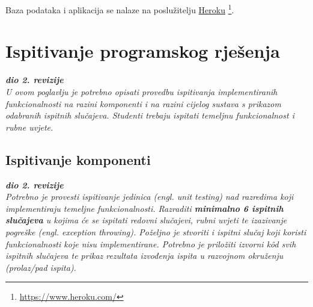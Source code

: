             Baza podataka i aplikacija se nalaze na poslužitelju \underline{Heroku}
            \footnote{\url{https://www.heroku.com/}}.
            
        
\newpage 

\begin{comment}   
        \section{Ispitivanje programskog rješenja}
			
			\textbf{\textit{dio 2. revizije}}
			
			Svi testovi izvršeni su pomoću Junit i Selenium. Ispitivanje se radilo po obrascima uporabe kako bi
            se provjerila osnovna funkcionalnost sustava, ali i nasumičnim kretanjima po aplikaciji
            kako bi se pronašle neočekivane greške  ili nepredvidena ponašanja.
            Svaki dio sustava je ispitan, no zbog jednostavnosti u dokumentaciji će biti prikazan
            samo dio ispitivanja. Prikazivanje ispitivanja UC?, UC?, UC?,UC?, UC? i UC?.
            
\end{comment}

		    \section{Ispitivanje programskog rješenja}
			
			\textbf{\textit{dio 2. revizije}}\\
			
			 \textit{U ovom poglavlju je potrebno opisati provedbu ispitivanja implementiranih funkcionalnosti na razini komponenti i na razini cijelog sustava s prikazom odabranih ispitnih slučajeva. Studenti trebaju ispitati temeljnu funkcionalnost i rubne uvjete.}
           
        \subsection{Ispitivanje komponenti}
		    
		    \textbf{\textit{dio 2. revizije}}\\
    
			\textit{Potrebno je provesti ispitivanje jedinica (engl. unit testing) nad razredima koji implementiraju temeljne funkcionalnosti. Razraditi \textbf{minimalno 6 ispitnih slučajeva} u kojima će se ispitati redovni slučajevi, rubni uvjeti te izazivanje pogreške (engl. exception throwing). Poželjno je stvoriti i ispitni slučaj koji koristi funkcionalnosti koje nisu implementirane. Potrebno je priložiti izvorni kôd svih ispitnih slučajeva te prikaz rezultata izvođenja ispita u razvojnom okruženju (prolaz/pad ispita). }
			
